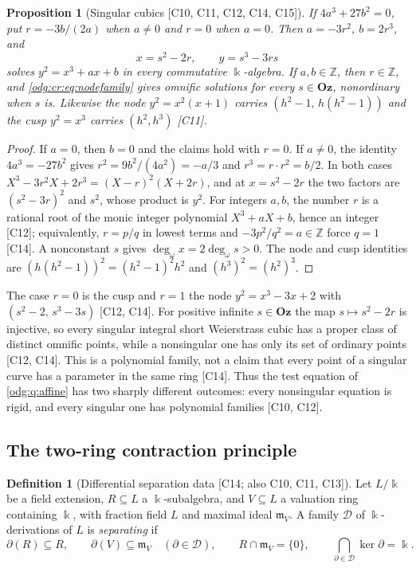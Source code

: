 \documentclass[11pt,oneside]{article}
\numberwithin{equation}{section}
\newtheorem{proposition}[proposition]{Proposition}
\theoremstyle{definition}
\newtheorem{definition}[definition]{Definition}
\theoremstyle{remark}
\newcommand{\Oz}{\mathbf{Oz}}
\newcommand{\Z}{\mathbb Z}
\newcommand{\ddeg}{\operatorname{deg}_{\omega}}
\newcommand{\src}[1]{\textup{\textsf{\small[#1]}}}
\begin{document}
\begin{proposition}[Singular cubics \src{C10, C11, C12, C14, C15}]\label{odg:cr:prop:singular}
If $4a^3+27b^2=0$, put $r=-3b/(2a)$ when $a\ne0$ and $r=0$ when $a=0$. Then
$a=-3r^2$, $b=2r^3$, and
\begin{equation}\label{odg:cr:eq:nodefamily}
 x=s^2-2r,\qquad y=s^3-3rs
\end{equation}
solves $y^2=x^3+ax+b$ in every commutative $\Bbbk$-algebra. If $a,b\in\Z$, then
$r\in\Z$, and \eqref{odg:cr:eq:nodefamily} gives omnific solutions for every
$s\in\Oz$, nonordinary when $s$ is. Likewise the node $y^2=x^2(x+1)$ carries
$(h^2-1,\,h(h^2-1))$ and the cusp $y^2=x^3$ carries $(h^2,h^3)$ \src{C11}.
\end{proposition}
\begin{proof}
If $a=0$, then $b=0$ and the claims hold with $r=0$. If $a\ne0$,
the identity $4a^3=-27b^2$ gives $r^2=9b^2/(4a^2)=-a/3$ and
$r^3=r\cdot r^2=b/2$. In both cases
$X^3-3r^2X+2r^3=(X-r)^2(X+2r)$, and at $x=s^2-2r$ the two factors are
$(s^2-3r)^2$ and $s^2$, whose product is $y^2$. For integers $a,b$, the number $r$
is a rational root of the monic integer polynomial $X^3+aX+b$, hence an integer
\src{C12}; equivalently, $r=p/q$ in lowest terms and $-3p^2/q^2=a\in\Z$ force
$q=1$ \src{C14}. A nonconstant $s$ gives $\ddeg x=2\ddeg s>0$. The node and cusp
identities are $(h(h^2-1))^2=(h^2-1)^2h^2$ and $(h^3)^2=(h^2)^3$.
\end{proof}

The case $r=0$ is the cusp and $r=1$ the node $y^2=x^3-3x+2$ with
$(s^2-2,\,s^3-3s)$ \src{C12, C14}. For positive infinite $s\in\Oz$ the map
$s\mapsto s^2-2r$ is injective, so every singular integral short Weierstrass cubic has a
proper class of distinct omnific points, while a nonsingular one has only its set
of ordinary points \src{C12, C14}. This is a polynomial family, not a claim that
every point of a singular curve has a parameter in the same ring \src{C14}. Thus
the test equation of \cref{odg:q:affine} has two sharply different outcomes:
every nonsingular equation is rigid, and every singular one has polynomial
families \src{C10, C12}.

\subsection{The two-ring contraction principle}\label{odg:cr:sub:tworing}

\begin{definition}[Differential separation data \src{C14; also C10, C11, C13}]\label{odg:cr:def:data}
Let $L/\Bbbk$ be a field extension, $R\subseteq L$ a $\Bbbk$-subalgebra, and
$V\subseteq L$ a valuation ring containing $\Bbbk$, with fraction field $L$ and
maximal ideal $\mathfrak m_V$. A family $\mathcal D$ of $\Bbbk$-derivations of $L$
is \emph{separating} if
\begin{equation}\label{odg:cr:eq:data}
 \partial(R)\subseteq R,\qquad \partial(V)\subseteq\mathfrak m_V
 \quad(\partial\in\mathcal D),\qquad R\cap\mathfrak m_V=\{0\},\qquad
 \bigcap_{\partial\in\mathcal D}\ker\partial=\Bbbk .
\end{equation}
\end{definition}
\end{document}
